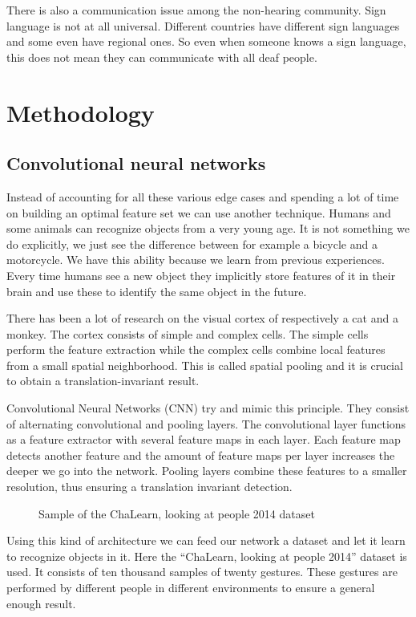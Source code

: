 \documentclass[twocolumn]{phdsymp} %
\begin{document}
There is also  a communication issue among the non-hearing community. Sign language is not at all universal. Different countries have different sign languages and some even have regional ones. So even when someone knows a sign language, this does not mean they can communicate with all deaf people.


\section{Methodology}

\subsection{Convolutional neural networks}

Instead of accounting for all these various edge cases and spending a lot of time on building an optimal feature set we can use another technique. Humans and some animals can recognize objects from a very young age. It is not something we do explicitly, we just see the difference between for example a bicycle and a motorcycle. We have this ability because we learn from previous experiences. Every time humans see a new object they implicitly store features of it in their brain and use these to identify the same object in the future.

There has been a lot of research on the visual cortex of respectively a cat and a monkey. The cortex consists of simple and complex cells. The simple cells perform the feature extraction while the complex cells combine local features from a small spatial neighborhood. This is called spatial pooling and it is crucial to obtain a translation-invariant result.

Convolutional Neural Networks (CNN) try and mimic this principle. They consist of alternating convolutional and pooling layers. The convolutional layer functions as a feature extractor with several feature maps in each layer. Each feature map detects another feature and the amount of feature maps per layer increases the deeper we go into the network. Pooling layers combine these features to a smaller resolution, thus ensuring a translation invariant detection.
\begin{figure}[ht]
	\centering
	\caption{Sample of the ChaLearn, looking at people 2014 dataset}
\end{figure}
Using this kind of architecture we can feed our network a dataset and let it learn to recognize objects in it. Here the “ChaLearn, looking at people 2014” dataset is used. It consists of ten thousand samples of twenty gestures. These gestures are performed by different people in different environments to ensure a general enough result.
\end{document}
